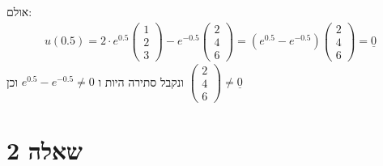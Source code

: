 \documentclass{article}
\begin{document}
אולם:
\begin{align*}
    u(0.5)=2\cdot e^{0.5} \begin{pmatrix}
                              1 \\
                              2 \\
                              3
                          \end{pmatrix} - e^{-0.5}\begin{pmatrix}
                                                      2 \\
                                                      4 \\
                                                      6
                                                  \end{pmatrix}=
    (e^{0.5}-e^{-0.5})\begin{pmatrix}
                          2 \\
                          4 \\
                          6
                      \end{pmatrix}=\underline{0}
\end{align*}
ונקבל סתירה היות ו $e^{0.5}-e^{-0.5}\ne 0$ וכן $\begin{pmatrix}
        2 \\
        4 \\
        6
    \end{pmatrix}\ne \underline{0}$

\pagebreak

\section*{שאלה 2}
\end{document}
